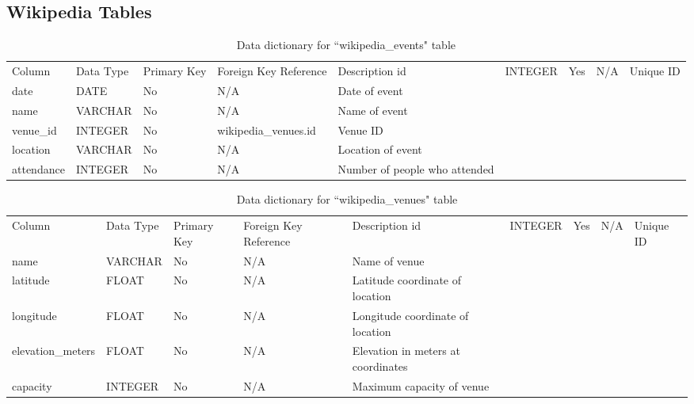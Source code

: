 \documentclass[12pt,twoside]{report}
\begin{document}
\subsection{Wikipedia Tables}
\tiny 
\begin{longtable}{lllll}
\caption{Data dictionary for ``wikipedia\_events" table}\\ 
\toprule
Column     & Data Type & Primary Key & Foreign Key Reference & Description                    \endfirsthead 
\toprule
id         & INTEGER   & Yes         & N/A                   & Unique ID                      \\
date       & DATE      & No          & N/A                   & Date of event                  \\
name       & VARCHAR   & No          & N/A                   & Name of event                  \\
venue\_id  & INTEGER   & No          & wikipedia\_venues.id  & Venue ID                       \\
location   & VARCHAR   & No          & N/A                   & Location of event              \\
attendance & INTEGER   & No          & N/A                   & Number of people who attended  \\
\bottomrule
\end{longtable}
\normalsize

\tiny 
\begin{longtable}{lllll}
\caption{Data dictionary for ``wikipedia\_venues" table}\\ 
\toprule
Column            & Data Type & Primary Key & Foreign Key Reference & Description                         \endfirsthead 
\toprule
id                & INTEGER   & Yes         & N/A                   & Unique ID                           \\
name              & VARCHAR   & No          & N/A                   & Name of venue                       \\
latitude          & FLOAT     & No          & N/A                   & Latitude coordinate of location     \\
longitude         & FLOAT     & No          & N/A                   & Longitude coordinate of location    \\
elevation\_meters & FLOAT     & No          & N/A                   & Elevation in meters at coordinates  \\
capacity          & INTEGER   & No          & N/A                   & Maximum capacity of venue           \\
\bottomrule
\end{longtable}
\normalsize
\end{document}
